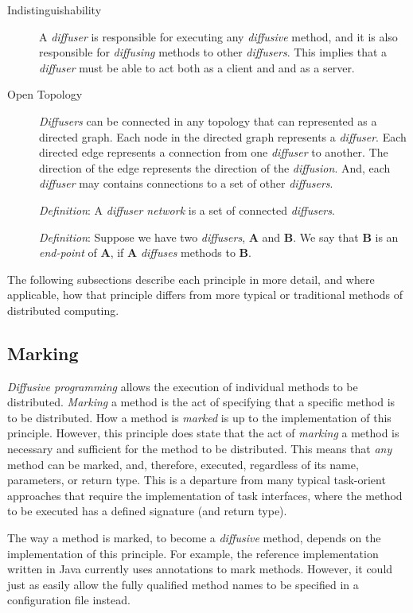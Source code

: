 \documentclass[11pt]{article}
\begin{document}
\begin{description}
	\item[Indistinguishability]
	A \emph{diffuser} is responsible for executing any \emph{diffusive} method, and it is also responsible for \emph{diffusing} methods to other \emph{diffusers}. This implies that a \emph{diffuser} must be able to act both as a client and and as a server.
	
	\item[Open Topology]
	\emph{Diffusers} can be connected in any topology that can represented as a directed graph. Each node in the directed graph represents a \emph{diffuser}. Each directed edge represents a connection from one \emph{diffuser} to another. The direction of the edge represents the direction of the \emph{diffusion}. And, each \emph{diffuser} may contains connections to a set of other \emph{diffusers}. 
	
	\emph{Definition}: A \emph{diffuser network} is a set of connected \emph{diffusers}.
	
	\emph{Definition}: Suppose we have two \emph{diffusers}, \textbf{A} and \textbf{B}. We say that \textbf{B} is an \emph{end-point} of \textbf{A}, if \textbf{A} \emph{diffuses} methods to \textbf{B}.

\end{description}

The following subsections describe each principle in more detail, and where applicable, how that principle differs from more typical or traditional methods of distributed computing.

\subsection{Marking\label{sec:marking}}
\emph{Diffusive programming} allows the execution of individual methods to be distributed. \emph{Marking} a method is the act of specifying that a specific method is to be distributed. How a method is \emph{marked} is up to the implementation of this principle. However, this principle does state that the act of \emph{marking} a method is necessary and sufficient for the method to be distributed. This means that \emph{any} method can be marked, and, therefore, executed, regardless of its name, parameters, or return type. This is a departure from many typical task-orient approaches that require the implementation of task interfaces, where the method to be executed has a defined signature (and return type).

The way a method is marked, to become a \emph{diffusive} method, depends on the implementation of this principle. For example, the reference implementation written in Java currently uses annotations to mark methods. However, it could just as easily allow the fully qualified method names to be specified in a configuration file instead.
\end{document}
